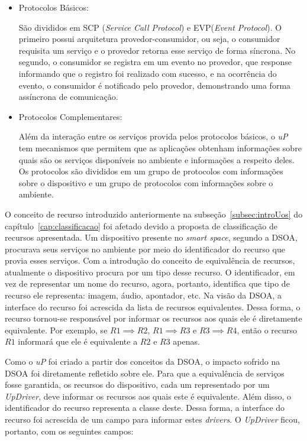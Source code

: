 \begin{itemize}
	\item Protocolos Básicos: 

		São divididos em SCP (\emph{Service Call Protocol}) e EVP(\emph{Event Protocol}). O primeiro possui arquitetura provedor-consumidor, ou seja, o consumidor requisita um serviço e o provedor retorna esse serviço de forma síncrona. No segundo, o consumidor se registra em um evento no provedor, que response informando que o registro foi realizado com sucesso, e na ocorrência do evento, o consumidor é notificado pelo provedor, demonstrando uma forma assíncrona de comunicação.
	\item Protocolos Complementares:

		Além da interação entre os serviços provida pelos protocolos básicos, o \emph{uP} tem mecanismos que permitem que as aplicações obtenham informações sobre quais são os serviços disponíveis no ambiente e informações a respeito deles. Os protocolos são divididos em um grupo de protocolos com informações sobre o dispositivo e um grupo de protocolos com informações sobre o ambiente. 
\end{itemize}

O conceito de recurso introduzido anteriormente na subseção~\ref{subsec:introUos} do capítulo~\ref{cap:classificacao} foi afetado devido a proposta de classificação de recursos apresentada. Um dispositivo presente no \emph{smart space}, segundo a DSOA, procurava seus serviços no ambiente por meio do identificador do recurso que provia esses serviços. Com a introdução do conceito de equivalência de recursos, atualmente o dispositivo procura por um tipo desse recurso. O identificador, em vez de representar um nome do recurso, agora, portanto, identifica que tipo de recurso ele representa: imagem, áudio, apontador, etc. Na visão da DSOA, a interface do recurso foi acrescida da lista de recursos equivalentes. Dessa forma, o recurso tornou-se responsável por informar os recursos aos quais ele é diretamente equivalente. Por exemplo, se $R1 \implies R2$, $R1 \implies R3$ e $R3 \implies R4$, então o recurso $R1$ informará que ele é equivalente a $R2$ e $R3$ apenas.

Como o \emph{uP} foi criado a partir dos conceitos da DSOA, o impacto sofrido na DSOA foi diretamente refletido sobre ele. Para que a equivalência de serviços fosse garantida, os recursos do dispositivo, cada um representado por um \emph{UpDriver}, deve informar os recursos aos quais este é equivalente. Além disso, o identificador do recurso representa a classe deste. Dessa forma, a interface do recurso foi acrescida de um campo para informar estes \emph{drivers}. O \emph{UpDriver} ficou, portanto, com os seguintes campos:


